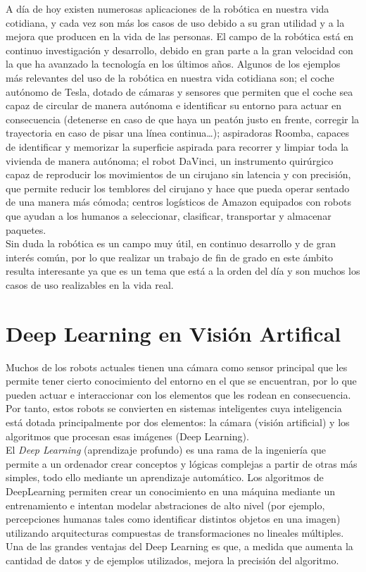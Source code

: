 \documentclass{report}
\begin{document}
A día de hoy existen numerosas aplicaciones de la robótica en nuestra vida cotidiana, y cada vez son más los casos de uso debido a su gran utilidad y a la mejora que producen en la vida de las personas. El campo de la robótica está en continuo investigación y desarrollo, debido en gran parte a la gran velocidad con la que ha avanzado la tecnología en los últimos años. Algunos de los ejemplos más relevantes del uso de la robótica en nuestra vida cotidiana son; el coche autónomo de Tesla, dotado de cámaras y sensores que permiten que el coche sea capaz de circular de manera autónoma e identificar su entorno para actuar en consecuencia (detenerse en caso de que haya un peatón justo en frente, corregir la trayectoria en caso de pisar una línea continua…);  aspiradoras Roomba, capaces de identificar y memorizar la superficie aspirada para recorrer  y limpiar toda la vivienda de manera autónoma;  el robot DaVinci, un instrumento quirúrgico capaz de reproducir los movimientos de un cirujano sin latencia y con precisión, que permite reducir los temblores del cirujano y hace que pueda operar sentado de una manera más cómoda; centros logísticos de Amazon equipados con robots que ayudan a los humanos a seleccionar, clasificar, transportar y almacenar paquetes.
\\

Sin duda la robótica es un campo muy útil, en continuo desarrollo y de gran interés común, por lo que realizar un trabajo de fin de grado en este ámbito resulta interesante ya que es un tema que está a la orden del día y son muchos los casos de uso realizables en la vida real.


\section{Deep Learning en Visión Artifical}
Muchos de los robots actuales tienen una cámara como sensor principal que les permite tener cierto conocimiento del entorno en el que se encuentran, por lo que pueden actuar e interaccionar con los elementos que les rodean en consecuencia. Por tanto, estos robots se convierten en sistemas inteligentes cuya inteligencia está dotada principalmente por dos elementos: la cámara (visión artificial) y los algoritmos que procesan esas imágenes (Deep Learning).
\\

El \textit{Deep Learning} (aprendizaje profundo) es una rama de la ingeniería que permite a un ordenador crear conceptos y lógicas complejas a partir de otras más simples, todo ello mediante un aprendizaje automático. Los algoritmos de DeepLearning permiten crear un conocimiento en una máquina mediante un entrenamiento e intentan modelar abstraciones de alto nivel (por ejemplo, percepciones humanas tales como identificar distintos objetos en una imagen) utilizando arquitecturas compuestas de transformaciones no lineales múltiples. Una de las grandes ventajas del Deep Learning es que, a medida que aumenta la cantidad de datos y de ejemplos utilizados, mejora la precisión del algoritmo.
\\
\end{document}
